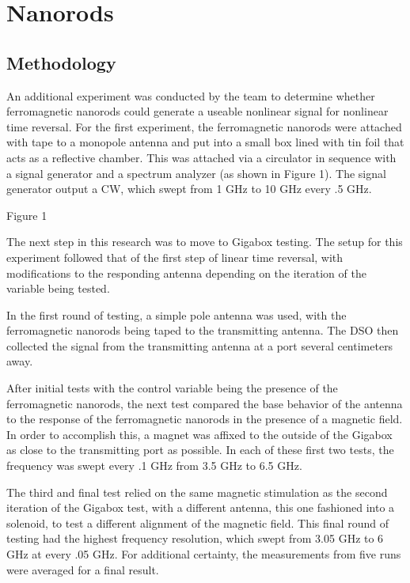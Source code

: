 \chapter{Nanorods}

\label{ch:nanorod}


\section{Methodology}
\label{sec:nanorod-meth}

An additional experiment was conducted by the team to determine whether ferromagnetic nanorods could generate a useable nonlinear signal for nonlinear time reversal. For the first experiment, the ferromagnetic nanorods were attached with tape to a monopole antenna and put into a small box lined with tin foil that acts as a reflective chamber. This was attached via a circulator in sequence with a signal generator and a spectrum analyzer (as shown in Figure 1). The signal generator output a CW, which swept from 1 GHz to 10 GHz every .5 GHz.



                  Figure 1

The next step in this research was to move to Gigabox testing. The setup for this experiment followed that of the first step of linear time reversal, with modifications to the responding antenna depending on the iteration of the variable being tested.

In the first round of testing, a simple pole antenna was used, with the ferromagnetic nanorods being taped to the transmitting antenna. The DSO then collected the signal from the transmitting antenna at a port several centimeters away.

After initial tests with the control variable being the presence of the ferromagnetic nanorods, the next test compared the base behavior of the antenna to the response of the ferromagnetic nanorods in the presence of a magnetic field. In order to accomplish this, a magnet was affixed to the outside of the Gigabox as close to the transmitting port as possible. In each of these first two tests, the frequency was swept every .1 GHz from 3.5 GHz to 6.5 GHz.

The third and final test relied on the same magnetic stimulation as the second iteration of the Gigabox test, with a different antenna, this one fashioned into a solenoid, to test a different alignment of the magnetic field. This final round of testing had the highest frequency resolution, which swept from 3.05 GHz to 6 GHz at every .05 GHz. For additional certainty, the measurements from five runs were averaged for a final result.

